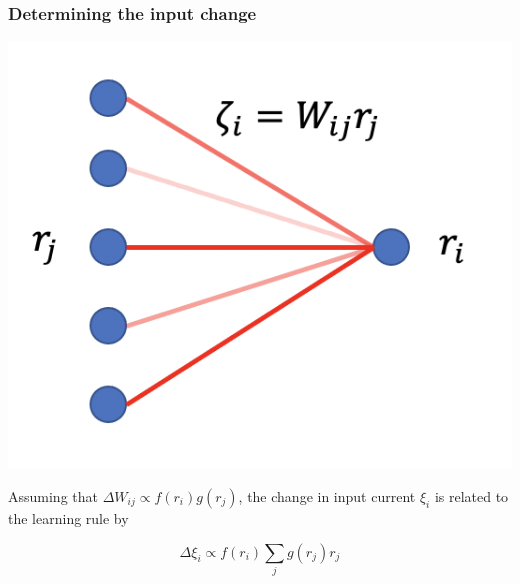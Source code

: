 \documentclass{beamer}
\begin{document}
\begin{frame}[plain]
\frametitle{Determining the input change}

\begin{center}
\includegraphics[scale=0.5]{net}
\end{center}

Assuming that $\Delta W_{ij} \propto f(r_{i})g(r_{j})$, the change in input current $\xi_{i}$ is related to the learning rule by

\begin{equation*}
\Delta \xi_{i}  \propto  f(r_{i}) \sum_{j} g(r_{j})r_{j}
\end{equation*}

\end{frame}
\end{document}
